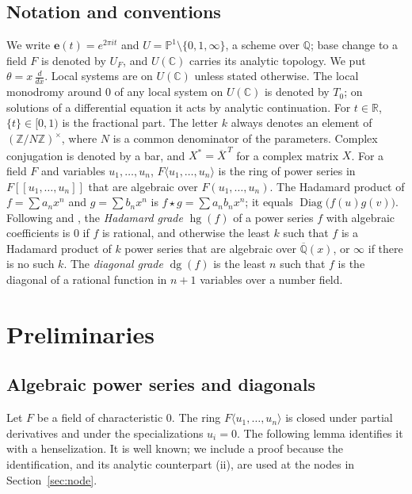 \documentclass[11pt]{amsart}
\theoremstyle{definition}
\theoremstyle{remark}
\numberwithin{equation}{section}
\newcommand{\Q}{\mathbb{Q}}
\newcommand{\Z}{\mathbb{Z}}
\newcommand{\C}{\mathbb{C}}
\newcommand{\R}{\mathbb{R}}
\newcommand{\Qb}{\overline{\mathbb{Q}}}
\newcommand{\PP}{\mathbb{P}}
\newcommand{\e}{\mathbf{e}}
\newcommand{\alg}[2]{#1\langle #2\rangle}
\DeclareMathOperator{\Diag}{Diag}
\DeclareMathOperator{\hg}{hg}
\DeclareMathOperator{\dg}{dg}
\begin{document}
\subsection*{Notation and conventions}
We write $\e(t)=e^{2\pi it}$ and $U=\PP^1\setminus\{0,1,\infty\}$, a scheme over $\Q$; base change to a field $F$ is denoted by $U_F$, and $U(\C)$ carries its analytic topology. We put $\theta=x\,\frac{d}{dx}$. Local systems are on $U(\C)$ unless stated otherwise. The local monodromy around $0$ of any local system on $U(\C)$ is denoted by $T_0$; on solutions of a differential equation it acts by analytic continuation. For $t\in\R$, $\{t\}\in[0,1)$ is the fractional part. The letter $k$ always denotes an element of $(\Z/N\Z)^\times$, where $N$ is a common denominator of the parameters. Complex conjugation is denoted by a bar, and $X^*=\overline X^{\,T}$ for a complex matrix $X$. For a field $F$ and variables $u_1,\dots,u_n$, $\alg F{u_1,\dots,u_n}$ is the ring of power series in $F[[u_1,\dots,u_n]]$ that are algebraic over $F(u_1,\dots,u_n)$. The Hadamard product of $f=\sum a_nx^n$ and $g=\sum b_nx^n$ is $f\star g=\sum a_nb_nx^n$; it equals $\Diag\big(f(u)g(v)\big)$. Following \citet{AlloucheMendesFrance2011} and \citet{HarderKramerMiller2026}, the \emph{Hadamard grade} $\hg(f)$ of a power series $f$ with algebraic coefficients is $0$ if $f$ is rational, and otherwise the least $k$ such that $f$ is a Hadamard product of $k$ power series that are algebraic over $\Qb(x)$, or $\infty$ if there is no such $k$. The \emph{diagonal grade} $\dg(f)$ is the least $n$ such that $f$ is the diagonal of a rational function in $n+1$ variables over a number field.

\section{Preliminaries}\label{sec:prelim}

\subsection{Algebraic power series and diagonals}\label{subsec:alg}
Let $F$ be a field of characteristic $0$. The ring $\alg F{u_1,\dots,u_n}$ is closed under partial derivatives and under the specializations $u_i=0$. The following lemma identifies it with a henselization. It is well known; we include a proof because the identification, and its analytic counterpart (ii), are used at the nodes in Section~\ref{sec:node}.
\end{document}
